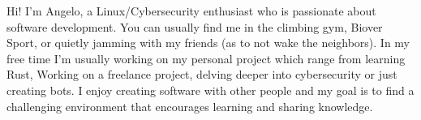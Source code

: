 

\begin{cvparagraph}
	Hi! I'm Angelo, a Linux/Cybersecurity enthusiast who is passionate about software development. You can usually find me in the climbing gym, Biover Sport, or quietly jamming with my friends (as to not wake the neighbors). In my free time I'm usually working on my personal project which range from learning Rust, Working on a freelance project, delving deeper into cybersecurity or just creating bots. I enjoy creating software with other people and my goal is to find a challenging environment that encourages learning and sharing knowledge.
\end{cvparagraph}


